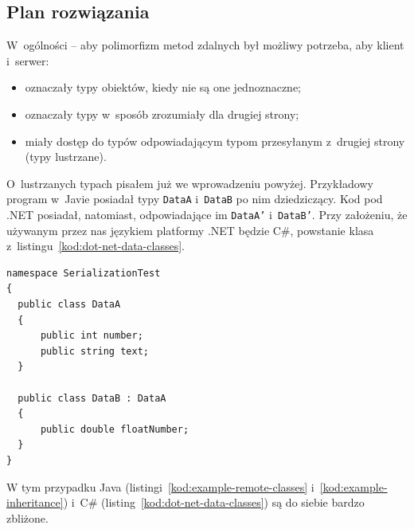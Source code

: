 %


\subsection{Plan rozwiązania}
W~ogólności -- aby polimorfizm metod zdalnych był możliwy potrzeba, aby klient i~serwer:
\begin{itemize}
	\item oznaczały typy obiektów, kiedy nie są one jednoznaczne;
	\item oznaczały typy w~sposób zrozumiały dla drugiej strony;
	\item miały dostęp do typów odpowiadającym typom przesyłanym z~drugiej strony (typy lustrzane).
\end{itemize}

O~lustrzanych typach pisałem już we wprowadzeniu powyżej. Przykładowy program w~Javie posiadał typy \texttt{DataA} i~\texttt{DataB} po nim dziedziczący. Kod pod .NET posiadał, natomiast, odpowiadające im \texttt{DataA'} i~\texttt{DataB'}.
Przy założeniu, że używanym przez nas językiem platformy .NET będzie C\#, powstanie klasa z~listingu~\ref{kod:dot-net-data-classes}.

\begin{lstlisting}[frame=single, float, caption={Przykładowe klasy danych zapisane w~C\#}, label=kod:dot-net-data-classes]
namespace SerializationTest
{
  public class DataA
  {
      public int number;
      public string text;
  }
  
  public class DataB : DataA
  {
      public double floatNumber;
  }
}
\end{lstlisting}

W tym przypadku Java (listingi~\ref{kod:example-remote-classes} i~\ref{kod:example-inheritance}) i~C\# (listing~\ref{kod:dot-net-data-classes}) są do siebie bardzo zbliżone.

